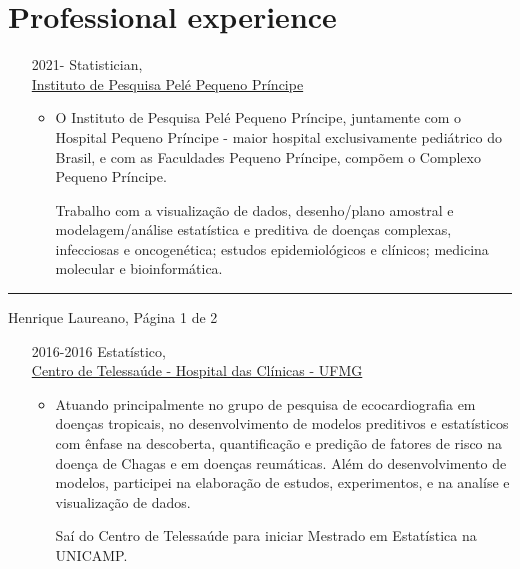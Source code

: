 \documentclass[12pt]{article}
\newcommand{\horrule}[1]{\noindent\rule{\linewidth}{#1}}
\begin{document}
\vspace{-0.5cm}
\section*{Professional experience}

\begin{itemize}
 \item[2021-] Statistician,\\
              \href{http://www.pelepequenoprincipe.org.br/}{\color{blue}
                Instituto de Pesquisa Pel\'{e} Pequeno Pr\'{i}ncipe}
  \begin{itemize}
  \item O Instituto de Pesquisa Pel\'{e} Pequeno Pr\'{i}ncipe,
        juntamente com o Hospital Pequeno Pr\'{i}ncipe - maior hospital
        exclusivamente pedi\'{a}trico do Brasil, e com as Faculdades
        Pequeno Pr\'{i}ncipe, comp\~{o}em o Complexo Pequeno
        Pr\'{i}ncipe.

        Trabalho com a visualiza\c{c}\~{a}o de dados, desenho/plano
        amostral e modelagem/an\'{a}lise estat\'{i}stica e preditiva de
        doen\c{c}as complexas, infecciosas e oncogen\'{e}tica; estudos
        epidemiol\'{o}gicos e cl\'{i}nicos; medicina molecular e
        bioinform\'{a}tica.
  \end{itemize}
\end{itemize}

\vspace{\fill}
\horrule{1pt}
\noindent Henrique Laureano, \hfill P\'{a}gina 1 de 2

\begin{itemize}
 \item[2016-2016] Estat\'{i}stico,\\
                  \href{https://telessaude.hc.ufmg.br/}{\color{blue}
                    Centro de Telessa\'{u}de -
                    Hospital das Cl\'{i}nicas - UFMG}
  \begin{itemize}
   \item Atuando principalmente no grupo de pesquisa de ecocardiografia
         em doen\c{c}as tropicais, no desenvolvimento de modelos
         preditivos e estat\'{i}sticos com \^{e}nfase na descoberta,
         quantifica\c{c}\~{a}o e predi\c{c}\~{a}o de fatores de risco na
         doen\c{c}a de Chagas e em doen\c{c}as reum\'{a}ticas. Al\'{e}m
         do desenvolvimento de modelos, participei na elabora\c{c}\~{a}o
         de estudos, experimentos, e na anal\'{i}se e
         visualiza\c{c}\~{a}o de dados.

         Sa\'{i} do Centro de Telessa\'{u}de para iniciar Mestrado em
         Estat\'{i}stica na UNICAMP.
  \end{itemize}
\end{itemize}
\end{document}
